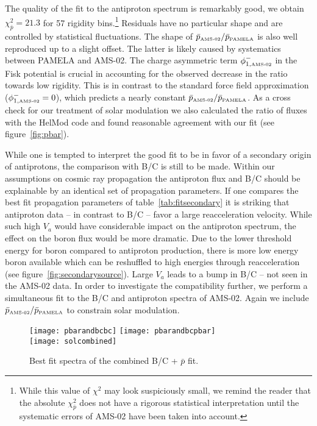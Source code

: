 \documentclass[a4paper,11pt]{article}
\begin{document}
The quality of the fit to the antiproton spectrum is remarkably good, we obtain $\chi_{\bar{p}}^2=21.3$ for 57 rigidity bins.\footnote{While this value of $\chi^2$ may look suspiciously small, we remind the reader that the absolute $\chi_{\bar{p}}^2$ does not have a rigorous statistical interpretation until the systematic errors of AMS-02 have been taken into account.} Residuals have no particular shape and are controlled by statistical fluctuations. The shape of $\bar{p}_{\text{\tiny{AMS-02}}}/\bar{p}_{\text{\tiny{PAMELA}}}$ is also well reproduced up to a slight offset. The latter is likely caused by systematics between PAMELA and AMS-02. The charge asymmetric term $\phi_{1,\text{\tiny{AMS-02}}}^-$ in the Fisk potential is crucial in accounting for the observed decrease in the ratio towards low rigidity. This is in contrast to the standard force field approximation ($\phi_{1,\text{\tiny{AMS-02}}}^-=0$), which predicts a nearly constant $\bar{p}_{\text{\tiny{AMS-02}}}/\bar{p}_{\text{\tiny{PAMELA}}}$. As a cross check for our treatment of solar modulation we also calculated the ratio of fluxes with the HelMod code and found reasonable agreement with our fit (see figure~\ref{fig:pbar}). 

While one is tempted to interpret the good fit to be in favor of a secondary origin of antiprotons, the comparison with B/C is still to be made. Within our assumptions on cosmic ray propagation the antiproton flux and B/C should be explainable by an identical set of propagation parameters. If one compares the best fit propagation parameters of table~\ref{tab:fitsecondary} it is striking that antiproton data -- in contrast to B/C -- favor a large reacceleration velocity. While such high $V_a$ would have considerable impact on the antiproton spectrum, the effect on the boron flux would be more dramatic.  Due to the lower threshold energy for boron compared to antiproton production, there is more low energy boron available which can be reshuffled to high energies through reacceleration (see figure~\ref{fig:secondarysource}).
Large $V_a$ leads to a bump in B/C -- not seen in the AMS-02 data. In order to investigate the compatibility further, we perform a simultaneous fit to the B/C and antiproton spectra of AMS-02. Again we include $\bar{p}_{\text{\tiny{AMS-02}}}/\bar{p}_{\text{\tiny{PAMELA}}}$ to constrain solar modulation.

\begin{figure}[htp]
\begin{center}
  \texttt{[image: pbarandbcbc]}\hspace{3mm}
  \texttt{[image: pbarandbcpbar]}\\[2mm]
  \texttt{[image: solcombined]}
\end{center}
\caption{Best fit spectra of the combined B/C + $\bar{p}$ fit.}
\label{fig:bcandpbar}
\end{figure}
\end{document}
